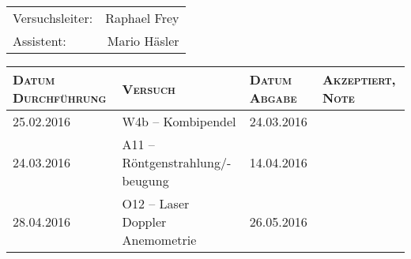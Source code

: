 \begin{titlepage}

    \maketitle

    \vspace{10mm}
    \begin{center}
    \begin{tabular}{lr}

        \Huge{Versuchsleiter:} & \Huge{Raphael Frey} \\
        \Huge{Assistent:} & \Huge{Mario H\"asler} \\

    \end{tabular}

    \vspace{20mm}

    \Large
    \begin{tabular}{p{27mm}|p{67mm}|p{23mm}|p{26mm}}


        \textsc{Datum Durchf\"uhrung} & \textsc{Versuch} & \textsc{Datum Abgabe} & \textsc{Akzeptiert, Note} \\
        [10mm]
        \hline
        25.02.2016 & W4b -- Kombipendel                     & 24.03.2016 & \\
        [10mm]
        24.03.2016 & A11 -- R\"ontgenstrahlung/-beugung     & 14.04.2016 & \\
        [10mm]
        28.04.2016 & O12 -- Laser Doppler Anemometrie       & 26.05.2016 & \\

    \end{tabular}
    \end{center}
    \normalsize

\end{titlepage}
